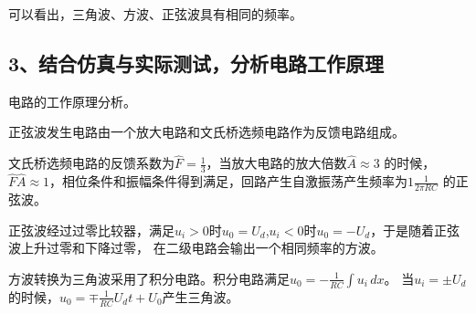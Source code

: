 \documentclass[UTF8]{ctexart}
\begin{document}
可以看出，三角波、方波、正弦波具有相同的频率。

\subsection*{3、结合仿真与实际测试，分析电路工作原理}

电路的工作原理分析。

正弦波发生电路由一个放大电路和文氏桥选频电路作为反馈电路组成。

文氏桥选频电路的反馈系数为$\hat{F} = \frac{1}{3}$，当放大电路的放大倍数$\hat{A} \approx 3$
的时候，$\hat{F} \hat{A} \approx 1$，相位条件和振幅条件得到满足，回路产生自激振荡产生频率为$1\frac{1}{2 \pi RC}$
的正弦波。

正弦波经过过零比较器，满足$u_i > 0$时$u_0 = U_d$,$u_i < 0$时$u_0 = -U_d$，于是随着正弦波上升过零和下降过零，
在二级电路会输出一个相同频率的方波。

方波转换为三角波采用了积分电路。积分电路满足$u_0 = - \frac{1}{RC} \int u_i  \,dx $。
当$u_i = \pm U_d$的时候，$u_0 =  \mp \frac{1}{RC} U_d t + U_0$产生三角波。
\end{document}
